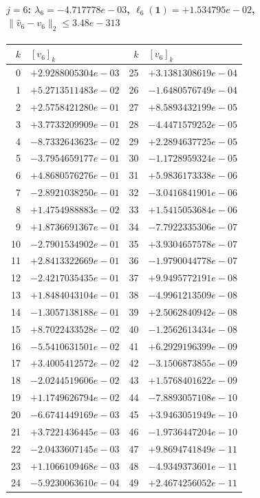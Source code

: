 \paragraph{$j = 6$: $\lambda_{6} = -4.717778e-03$, \quad $\ell_{6}(\mathbf{1}) = +1.534795e-02$, \quad $\|\hat{v}_{6} - v_{6}\|_2 \leq 3.48e-313$}
\begin{center}
{\footnotesize
\begin{tabular}{r@{\;\;}l@{\quad}r@{\;\;}l}
\toprule
$k$ & $[v_{6}]_k$ & $k$ & $[v_{6}]_k$ \\
\midrule
0 & $+2.9288005304e-03$ & 25 & $+3.1381308619e-04$ \\
1 & $+5.2713511483e-02$ & 26 & $-1.6480576749e-04$ \\
2 & $+2.5758421280e-01$ & 27 & $+8.5893432199e-05$ \\
3 & $+3.7733209909e-01$ & 28 & $-4.4471579252e-05$ \\
4 & $-8.7332643623e-02$ & 29 & $+2.2894637725e-05$ \\
5 & $-3.7954659177e-01$ & 30 & $-1.1728959324e-05$ \\
6 & $+4.8680576276e-01$ & 31 & $+5.9836173338e-06$ \\
7 & $-2.8921038250e-01$ & 32 & $-3.0416841901e-06$ \\
8 & $+1.4754988883e-02$ & 33 & $+1.5415053684e-06$ \\
9 & $+1.8736691367e-01$ & 34 & $-7.7922335306e-07$ \\
10 & $-2.7901534902e-01$ & 35 & $+3.9304657578e-07$ \\
11 & $+2.8413322669e-01$ & 36 & $-1.9790044778e-07$ \\
12 & $-2.4217035435e-01$ & 37 & $+9.9495772191e-08$ \\
13 & $+1.8484043104e-01$ & 38 & $-4.9961213509e-08$ \\
14 & $-1.3057138188e-01$ & 39 & $+2.5062840942e-08$ \\
15 & $+8.7022433528e-02$ & 40 & $-1.2562613434e-08$ \\
16 & $-5.5410631501e-02$ & 41 & $+6.2929196399e-09$ \\
17 & $+3.4005412572e-02$ & 42 & $-3.1506873855e-09$ \\
18 & $-2.0244519606e-02$ & 43 & $+1.5768401622e-09$ \\
19 & $+1.1749626794e-02$ & 44 & $-7.8893057108e-10$ \\
20 & $-6.6741449169e-03$ & 45 & $+3.9463051949e-10$ \\
21 & $+3.7221436445e-03$ & 46 & $-1.9736447204e-10$ \\
22 & $-2.0433607145e-03$ & 47 & $+9.8694741849e-11$ \\
23 & $+1.1066109468e-03$ & 48 & $-4.9349373601e-11$ \\
24 & $-5.9230063610e-04$ & 49 & $+2.4674256052e-11$ \\
\bottomrule
\end{tabular}
}
\end{center}

